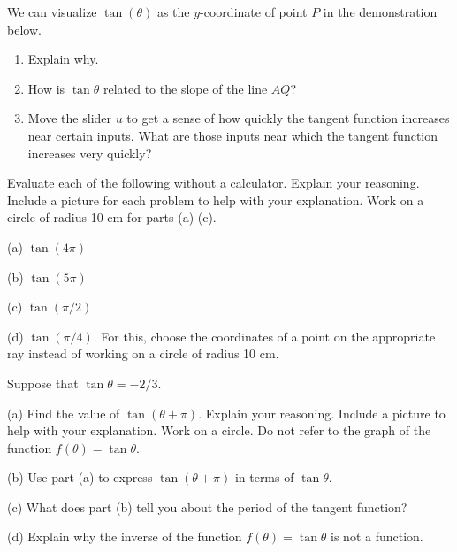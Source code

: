 \documentclass{ximera}
\begin{document}
\begin{exploration}\label{Exp3:Comp}
We can visualize $\tan(\theta)$ as the $y$-coordinate of point $P$ in the demonstration below. 
\begin{question} \label{Qetgfgyyy5} 
\begin{enumerate}
\item Explain why.

\item How is $\tan \theta$ related to the slope of the line $AQ$?

\item Move the slider $u$ to get a sense of how quickly the tangent function increases near certain inputs. What are those inputs near which the tangent function increases very quickly?

\end{enumerate}
\end{question}


 
\begin{onlineOnly}
    \begin{center}
\end{center}
\end{onlineOnly}
\end{exploration}



\begin{question}   \label{Q9:InverseTrig}
Evaluate each of the following without a calculator. Explain your reasoning. Include a picture for each problem to help with your explanation. Work on a circle of radius 10 cm for parts (a)-(c).

(a) $\tan (4\pi)$

(b) $\tan (5\pi)$

(c) $\tan (\pi/2)$

(d) $\tan (\pi/4)$. For this, choose the coordinates of a point on the appropriate ray instead of working on a circle of radius 10 cm.

\end{question}


\begin{question}   \label{Q11:InverseTrig}
Suppose that $\tan\theta = -2/3$.

(a) Find the value of $\tan (\theta + \pi)$. Explain your reasoning. Include a picture to help with your explanation. Work on a circle. Do not refer to the graph of the function $f(\theta) = \tan\theta$.

(b) Use part (a) to express $\tan(\theta + \pi)$ in terms of $\tan\theta$. 

(c) What does part (b) tell you about the period of the tangent function?

(d) Explain why the inverse of the function $f(\theta) = \tan\theta$ is not a function.

\end{question}
\end{document}
